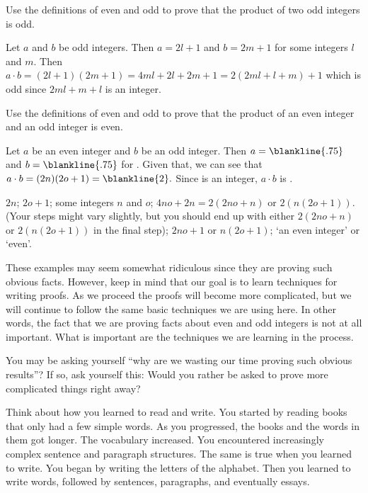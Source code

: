 \begin{exa}
Use the definitions of even and odd to prove that the product of two odd integers is odd.
\begin{pf}
Let $a$ and $b$ be odd integers.  Then
$a=2l+1$ and $b=2m +1$ for some integers $l$ and $m$. 
Then $a\cdot b= (2l + 1)(2m + 1) = 4ml + 2l + 2m + 1 =
2(2ml + l + m) + 1$
which is odd since $2ml + m +l$ is an integer.
\end{pf}
\end{exa}

\begin{fib}
Use the definitions of even and odd to prove that the product of an even integer and an odd integer is even.
\begin{pf}
Let $a$ be an even integer and $b$ be an odd integer.
Then $a=\blankline{.75}$  and $b=\blankline{.75}$ for .
Given that, we can see that $a\cdot b= (2n)(2o+1) = \blankline{2}.$
Since  is an integer, $a\cdot b$ is .
\end{pf}
\begin{answer}
$2n$;
$2o+1$;
some integers $n$ and $o$;
$4no+2n=2(2no+n)$ or $2(n(2o+1))$.  (Your steps might vary slightly, but you should end up with
either $2(2no+n)$ or  $2(n(2o+1))$ in the final step);
$2no + 1$  or $n(2o+1)$;
`an even integer' or `even'.

\end{answer}
\end{fib}

These examples may seem somewhat ridiculous since they are proving such obvious facts.  However, keep in
mind that our goal is to learn techniques for writing proofs.  As we proceed the proofs will become
more complicated, but we will continue to follow the same basic techniques we are using here.  
In other words, the fact that we are proving facts about even and odd integers is not at all important.
What is important are the techniques we are learning in the process.

You may be asking yourself ``why are we wasting our time proving such obvious results''?  
If so, ask yourself this:  Would you rather be asked to prove more complicated things right away?

Think about how you learned to read and write.
You started by reading books that only had a few simple words.
As you progressed, the books and the words in them got longer.  The vocabulary increased.
You encountered increasingly complex sentence and paragraph structures.  The same is true
when you learned to write.  You began by writing the letters of the alphabet.  Then you learned
to write words, followed by sentences, paragraphs, and eventually essays.

